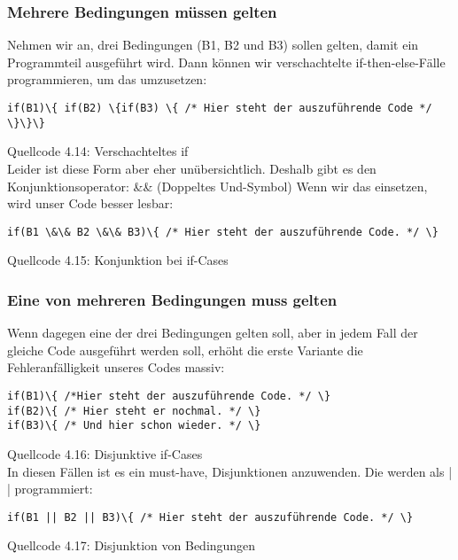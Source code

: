\subsubsection{Mehrere Bedingungen müssen gelten}

Nehmen wir an, drei Bedingungen (B1, B2 und B3) sollen gelten, damit ein Programmteil ausgeführt wird. Dann können wir verschachtelte if-then-else-Fälle programmieren, um das umzusetzen:\\
\begin{verbatim}
if(B1)\{ if(B2) \{if(B3) \{ /* Hier steht der auszuführende Code */ \}\}\}
\end{verbatim}
Quellcode 4.14: Verschachteltes if\\

Leider ist diese Form aber eher unübersichtlich. Deshalb gibt es den Konjunktionsoperator: \&\& (Doppeltes Und-Symbol) Wenn wir das einsetzen, wird unser Code besser lesbar:\\

\begin{verbatim}
if(B1 \&\& B2 \&\& B3)\{ /* Hier steht der auszuführende Code. */ \}
\end{verbatim}
Quellcode 4.15: Konjunktion bei if-Cases

\subsubsection{Eine von mehreren Bedingungen muss gelten}

Wenn dagegen eine der drei Bedingungen gelten soll, aber in jedem Fall der gleiche Code ausgeführt werden soll, erhöht die erste Variante die Fehleranfälligkeit unseres Codes massiv:\\

\begin{verbatim}
if(B1)\{ /*Hier steht der auszuführende Code. */ \}
if(B2)\{ /* Hier steht er nochmal. */ \}
if(B3)\{ /* Und hier schon wieder. */ \}
\end{verbatim}
Quellcode 4.16: Disjunktive if-Cases\\

In diesen Fällen ist es ein must-have, Disjunktionen anzuwenden. Die werden als | | programmiert:\\

\begin{verbatim}
if(B1 || B2 || B3)\{ /* Hier steht der auszuführende Code. */ \}
\end{verbatim}
Quellcode 4.17: Disjunktion von Bedingungen\\

